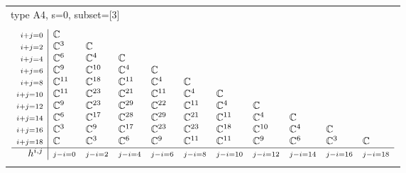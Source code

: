\documentclass[crop,border=2mm]{standalone}
\begin{document}
\begin{tabular}{l}
{\huge type A4, s=0, subset=[3]}\\ \\


$\displaystyle
\begin{array}{r|l l l l l l l l l l}
	{\scriptstyle i+j=0}&\mathbb{C}&&&&&&&&&\\
	{\scriptstyle i+j=2}&\mathbb{C}^{3}&\mathbb{C}&&&&&&&&\\
	{\scriptstyle i+j=4}&\mathbb{C}^{6}&\mathbb{C}^{4}&\mathbb{C}&&&&&&&\\
	{\scriptstyle i+j=6}&\mathbb{C}^{9}&\mathbb{C}^{10}&\mathbb{C}^{4}&\mathbb{C}&&&&&&\\
	{\scriptstyle i+j=8}&\mathbb{C}^{11}&\mathbb{C}^{18}&\mathbb{C}^{11}&\mathbb{C}^{4}&\mathbb{C}&&&&&\\
	{\scriptstyle i+j=10}&\mathbb{C}^{11}&\mathbb{C}^{23}&\mathbb{C}^{21}&\mathbb{C}^{11}&\mathbb{C}^{4}&\mathbb{C}&&&&\\
	{\scriptstyle i+j=12}&\mathbb{C}^{9}&\mathbb{C}^{23}&\mathbb{C}^{29}&\mathbb{C}^{22}&\mathbb{C}^{11}&\mathbb{C}^{4}&\mathbb{C}&&&\\
	{\scriptstyle i+j=14}&\mathbb{C}^{6}&\mathbb{C}^{17}&\mathbb{C}^{28}&\mathbb{C}^{29}&\mathbb{C}^{21}&\mathbb{C}^{11}&\mathbb{C}^{4}&\mathbb{C}&&\\
	{\scriptstyle i+j=16}&\mathbb{C}^{3}&\mathbb{C}^{9}&\mathbb{C}^{17}&\mathbb{C}^{23}&\mathbb{C}^{23}&\mathbb{C}^{18}&\mathbb{C}^{10}&\mathbb{C}^{4}&\mathbb{C}&\\
	{\scriptstyle i+j=18}&\mathbb{C}&\mathbb{C}^{3}&\mathbb{C}^{6}&\mathbb{C}^{9}&\mathbb{C}^{11}&\mathbb{C}^{11}&\mathbb{C}^{9}&\mathbb{C}^{6}&\mathbb{C}^{3}&\mathbb{C}\\
	\hline h^{i,j}&{\scriptstyle j-i=0}&{\scriptstyle j-i=2}&{\scriptstyle j-i=4}&{\scriptstyle j-i=6}&{\scriptstyle j-i=8}&{\scriptstyle j-i=10}&{\scriptstyle j-i=12}&{\scriptstyle j-i=14}&{\scriptstyle j-i=16}&{\scriptstyle j-i=18}
\end{array}
$ \\ \\



\end{tabular}
\end{document}
